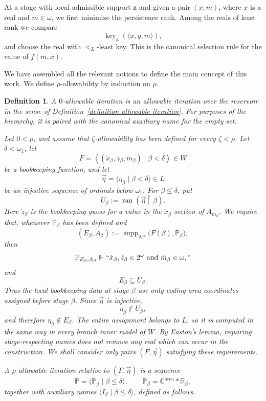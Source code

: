 \documentclass[a4paper,11pt]{article}
\newtheorem{definition}[theorem]{Definition}
\newcommand{\forceP}{\mathbb{P}}
\newcommand{\forceR}{\mathbb{R}}
\newcommand{\forceC}{\mathbb{C}}
\newcommand{\key}{\operatorname{key}}
\begin{document}
At a stage with local admissible support $\mathfrak a$ and given a pair $(x,m)$, where $x$ is a real and $m \in \omega$,
we first minimize the persistence rank.  Among the reals of least rank we compare
\[
   \key_{\mathfrak a}(\langle x,y,m\rangle),
\]
and choose the real with $<_L$-least key.  This is the canonical selection rule
for the value of $f(m,x)$.


We have assembled all the relevant notions to define the main concept of this work.
We define $\rho$-allowability by induction on $\rho$.

\begin{definition}
\label{definition-alpha-allowability}
A $0$-allowable iteration is an allowable iteration over the reservoir in the sense of Definition~\ref{definition-allowable-iteration}.  For purposes of the hierarchy, it is paired with the canonical auxiliary name for the empty set.

Let $0<\rho$, and assume that $\zeta$-allowability has been defined for every $\zeta<\rho$.  Let $\delta<\omega_1$, let
\[
   F=\left\langle
      (\dot x_\beta,\dot z_\beta,\dot m_\beta)
      \mid\beta<\delta
   \right\rangle\in W
\]
be a bookkeeping function, and let
\[
   \vec\eta=\langle\eta_\beta\mid\beta<\delta\rangle\in L
\]
be an injective sequence of ordinals below $\omega_1$.  For
$\beta\leq\delta$, put
\[
   U_\beta:=\operatorname{ran}(\vec\eta\upharpoonright\beta).
\]
Here $\dot z_\beta$ is the bookkeeping guess for a value in the
$\dot x_\beta$-section of $A_{\dot m_\beta}$.  We require that, whenever
$\forceP_\beta$ has been defined and
\[
   (E_\beta,A_\beta)
   :=\operatorname{supp}_{\mathrm{AP}}
      \bigl(F(\beta),\forceP_\beta\bigr),
\]
then
\[
   \forceP_{E_\beta,A_\beta}\Vdash
   ``\dot x_\beta,\dot z_\beta\in2^\omega
     \text{ and }\dot m_\beta\in\omega,"
\]
and
\[
   E_\beta\subseteq U_\beta.
\]
Thus the local bookkeeping data at stage $\beta$ use only coding-area
coordinates assigned before stage $\beta$.  Since $\vec\eta$ is injective,
\[
   \eta_\beta\notin U_\beta,
\]
and therefore $\eta_\beta\notin E_\beta$.  The entire assignment belongs to
$L$, so it is computed in the same way in every branch inner model of $W$.
By Easton's lemma, requiring stage-respecting names does not remove any real
which can occur in the construction.  We shall consider only pairs
$(F,\vec\eta)$ satisfying these requirements.

A $\rho$-allowable iteration relative to $(F,\vec\eta)$ is a sequence
\[
   \forceP=\langle\forceP_\beta\mid\beta\leq\delta\rangle,
   \qquad
   \forceP_\beta=\forceC^{\mathrm{area}}*\dot{\forceR}_\beta,
\]
together with auxiliary names $\langle\dot I_\beta\mid\beta\leq\delta\rangle$, defined as follows.


\end{definition}
\end{document}
